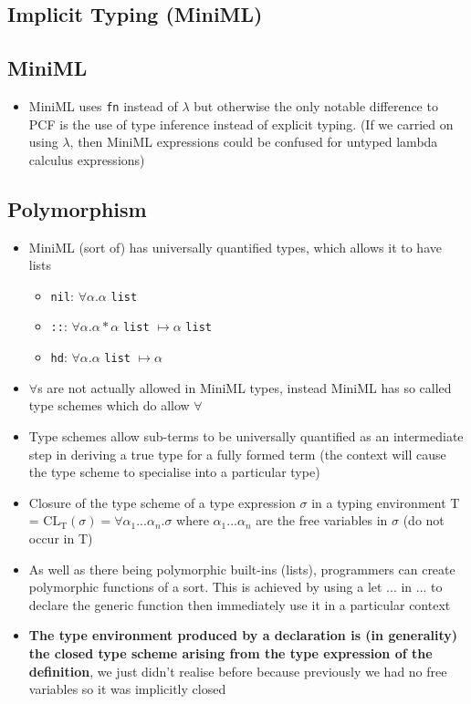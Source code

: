\documentclass[20pt,a4paper,landscape]{extarticle}
\begin{document}
\begin{flushleft}
\section{Implicit Typing (MiniML)}
\subsection{MiniML}
\begin{itemize}
\item MiniML uses \verb|fn| instead of $\lambda$ but otherwise the only notable difference to PCF is the use of type inference instead of explicit typing. (If we carried on using $\lambda$, then MiniML expressions could be confused for untyped lambda calculus expressions)
\end{itemize}
\subsection{Polymorphism}
\begin{itemize}
\item MiniML (sort of) has universally quantified types, which allows it to have lists
    \begin{itemize}
    \item \verb|nil|: $\forall \alpha. \alpha$ \verb|list|
    \item \verb|::|: $\forall \alpha. \alpha \ast \alpha$ \verb|list| $\mapsto \alpha$ \verb|list|
    \item \verb|hd|: $\forall \alpha. \alpha$ \verb|list| $\mapsto \alpha$
    \end{itemize}
\item $\forall$s are not actually allowed in MiniML types, instead MiniML has so called type schemes which do allow $\forall$
\item Type schemes allow sub-terms to be universally quantified as an intermediate step in deriving a true type for a fully formed term (the context will cause the type scheme to specialise into a particular type)
\item Closure of the type scheme of a type expression $\sigma$ in a typing environment T = $\textrm{CL}_\textrm{T}(\sigma) = \forall \alpha_1...\alpha_n.\sigma$ where $\alpha_1...\alpha_n$ are the free variables in $\sigma$ (do not occur in T)
\item As well as there being polymorphic built-ins (lists), programmers can create polymorphic functions of a sort. This is achieved by using a let ... in ... to declare the generic function then immediately use it in a particular context
\clearpage
\item \textbf{The type environment produced by a declaration is (in generality) the closed type scheme arising from the type expression of the definition}, we just didn't realise before because previously we had no free variables so it was implicitly closed
\end{itemize}

\end{flushleft}
\end{document}
